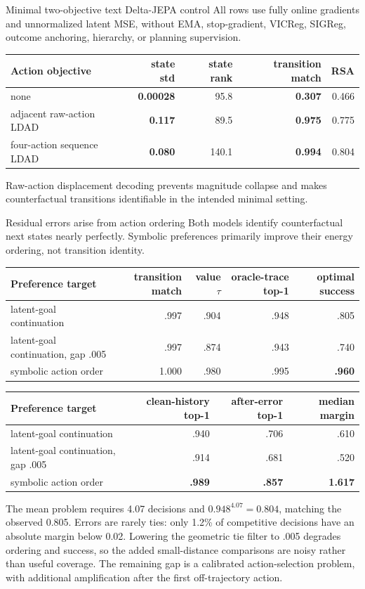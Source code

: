 \documentclass[aspectratio=169,10pt]{beamer}
\newcommand{\good}[1]{\textcolor{cgreen}{\textbf{#1}}}
\newcommand{\bad}[1]{\textcolor{cred}{\textbf{#1}}}
\begin{document}
\begin{frame}{Minimal two-objective text Delta-JEPA control}
\small
All rows use fully online gradients and unnormalized latent MSE, without EMA,
stop-gradient, VICReg, SIGReg, outcome anchoring, hierarchy, or planning
supervision.

\medskip
\centering
\begin{tabular}{lrrrr}
\toprule
Action objective & state std & state rank & transition match & RSA\\
\midrule
none & \bad{0.00028} & 95.8 & \bad{0.307} & 0.466\\
adjacent raw-action LDAD & \good{0.117} & 89.5 & \good{0.975} & 0.775\\
four-action sequence LDAD & \good{0.080} & 140.1 & \good{0.994} & 0.804\\
\bottomrule
\end{tabular}

\medskip
Raw-action displacement decoding prevents magnitude collapse and makes
counterfactual transitions identifiable in the intended minimal setting.
\end{frame}

\begin{frame}{Residual errors arise from action ordering}
\scriptsize
Both models identify counterfactual next states nearly perfectly. Symbolic
preferences primarily improve their energy ordering, not transition identity.

\medskip
\centering
\begin{tabular}{lrrrr}
\toprule
Preference target & transition match & value $\tau$ & oracle-trace top-1 & optimal success\\
\midrule
latent-goal continuation & .997 & .904 & .948 & .805\\
latent-goal continuation, gap .005 & .997 & .874 & .943 & .740\\
symbolic action order & 1.000 & .980 & .995 & \good{.960}\\
\bottomrule
\end{tabular}

\medskip
\begin{tabular}{lrrr}
\toprule
Preference target & clean-history top-1 & after-error top-1 & median margin\\
\midrule
latent-goal continuation & .940 & .706 & .610\\
latent-goal continuation, gap .005 & .914 & .681 & .520\\
symbolic action order & \good{.989} & \good{.857} & \good{1.617}\\
\bottomrule
\end{tabular}

\medskip
\raggedright
The mean problem requires 4.07 decisions and
$0.948^{4.07}=0.804$, matching the observed 0.805. Errors are rarely ties:
only 1.2\% of competitive decisions have an absolute margin below 0.02.
Lowering the geometric tie filter to .005 degrades ordering and success, so
the added small-distance comparisons are noisy rather than useful coverage.
The remaining gap is a calibrated action-selection problem, with additional
amplification after the first off-trajectory action.
\end{frame}
\end{document}
